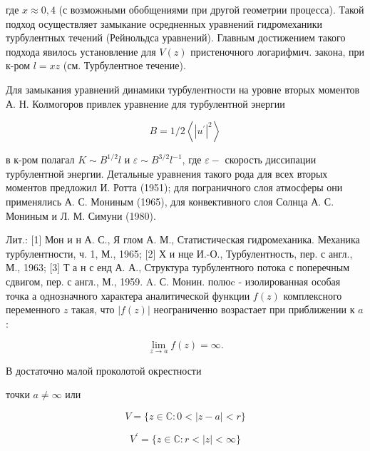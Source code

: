 \documentclass[10pt]{article}
\begin{document}
где $x \approx 0,4$ (с возможными обобщениями при другой геометрии процесса). Такой подход осуществляет замыкание осредненных уравнений гидромеханики турбулентных течений (Рейнольдса уравнений). Главным достижением такого подхода явилось установление для $V(z)$ пристеночного логарифмич. закона, при к-ром $l=x z$ (см. Турбулентное течение).



Для замыкания уравнений динамики турбулентности на уровне вторых моментов А. Н. Колмогоров привлек уравнение для турбулентной энергии



\[

B=1 / 2\left\langle\left|u^{\prime}\right|^{2}\right\rangle

\]



в к-ром полагал $K \sim B^{1 / 2} l$ и $\varepsilon \sim B^{3 / 2} l^{-1}$, где $\varepsilon-$ скорость диссипации турбулентной энергии. Детальные уравнения такого рода для всех вторых моментов предложил И. Ротта (1951); для пограничного слоя атмосферы они применялись А. С. Мониным (1965), для конвективного слоя Солнца А. С. Мониным и Л. М. Симуни (1980).



Лит.: [1] Мон и н А. С., Я глом А. М., Статистическая гидромеханика. Механика турбулентности, ч. 1, М., 1965; [2] Х и нце И.-О., Турбулентность, пер. с англ., М., 1963; [3] Т а н с енд А. А., Структура турбулентного потока с поперечным сдвигом, пер. с англ., М., 1959. A. С. Монин. полюc - изолированная особая точка а однозначного характера аналитической функции $f(z)$ комплексного переменного $z$ такая, что $|f(z)|$ неограниченно возрастает при приближении к $a$ :



\[

\lim _{z \rightarrow a} f(z)=\infty .

\]



В достаточно малой проколотой окрестности



точки $a \neq \infty$ или



\[

V=\{z \in \mathbb{C}: 0<|z-a|<r\}

\]



\[

V^{\prime}=\{z \in \mathbb{C}: r<|z|<\infty\}

\]
\end{document}
